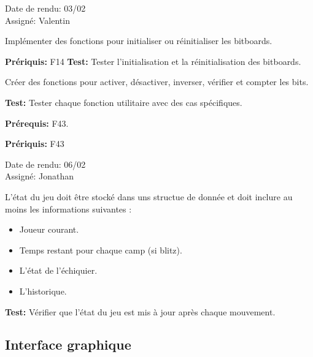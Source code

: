 \documentclass{article}
\begin{document}
\begin{needbox}
    \begin{duedatebox}
        Date de rendu: 03/02\\
        Assigné: Valentin
    \end{duedatebox}
    \begin{subneedbox}
        Implémenter des fonctions pour initialiser ou réinitialiser les bitboards.

        \textbf{Prériquis:} F14
        \textbf{Test:} Tester l'initialisation et la réinitialisation des bitboards.
    \end{subneedbox}

    \begin{subneedbox}
        Créer des fonctions pour activer, désactiver, inverser, vérifier et compter les bits.

        \textbf{Test:} Tester chaque fonction utilitaire avec des cas spécifiques.
    \end{subneedbox}

    \textbf{Prérequis:} F43.
\end{needbox}

\begin{needbox}
    \textbf{Prériquis:} F43
    \begin{duedatebox}
        Date de rendu: 06/02\\
        Assigné: Jonathan
    \end{duedatebox}


    L’état du jeu doit être stocké dans uns structue de donnée et doit inclure au moins les informations suivantes : \\
    \begin{itemize}
        \item Joueur courant.
        \item Temps restant pour chaque camp (si blitz).
        \item L’état de l’échiquier.  
        \item L’historique.
    \end{itemize}

    \textbf{Test:} Vérifier que l’état du jeu est mis à jour après chaque mouvement.
\end{needbox}

\subsection{Interface graphique}
\end{document}
